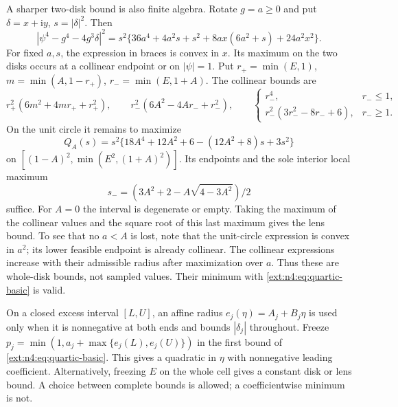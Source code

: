 A sharper two-disk bound is also finite algebra. Rotate $g=a\ge0$
and put $\delta=x+\mathrm i y$, $s=|\delta|^2$. Then
\[
 |\psi^4-g^4-4g^3\delta|^2
 =s^2\{36a^4+4a^2s+s^2+8ax(6a^2+s)+24a^2x^2\}.
\]
For fixed $a,s$, the expression in braces is convex in $x$.
Its maximum on the two disks occurs at a collinear endpoint or on
$|\psi|=1$. Put $r_+=\min(E,1)$, $m=\min(A,1-r_+)$,
$r_-=\min(E,1+A)$. The collinear bounds are
\[
 r_+^2(6m^2+4mr_++r_+^2),\qquad
 r_-^2(6A^2-4Ar_-+r_-^2),\qquad
 \begin{cases}r_-^4,&r_-\le1,\\
 r_-^2(3r_-^2-8r_-+6),&r_-\ge1.
 \end{cases}
\]
On the unit circle it remains to maximize
\begin{equation}\label{ext:n4:eq:lens-polynomial}
 Q_A(s)=s^2\{18A^4+12A^2+6-(12A^2+8)s+3s^2\}
\end{equation}
on $[(1-A)^2,\min(E^2,(1+A)^2)]$. Its endpoints and the sole
interior local maximum
\[
 s_-=(3A^2+2-A\sqrt{4-3A^2})/2
\]
suffice. For $A=0$ the interval is degenerate or empty.
Taking the maximum of the collinear values and the square root of
this last maximum gives the lens bound. To see that no $a<A$ is
lost, note that the unit-circle expression is convex in $a^2$;
its lower feasible endpoint is already collinear. The collinear
expressions increase with their admissible radius after maximization
over $a$. Thus these are whole-disk bounds, not sampled values.
Their minimum with \eqref{ext:n4:eq:quartic-basic} is valid.

On a closed excess interval $[L,U]$, an affine radius
$e_j(\eta)=A_j+B_j\eta$ is used only when it is nonnegative at both
ends and bounds $|\delta_j|$ throughout. Freeze
$p_j=\min(1,a_j+\max\{e_j(L),e_j(U)\})$ in the first bound of
\eqref{ext:n4:eq:quartic-basic}. This gives a quadratic in $\eta$
with nonnegative leading coefficient. Alternatively, freezing $E$
on the whole cell gives a constant disk or lens bound. A choice
between complete bounds is allowed; a coefficientwise minimum is not.


